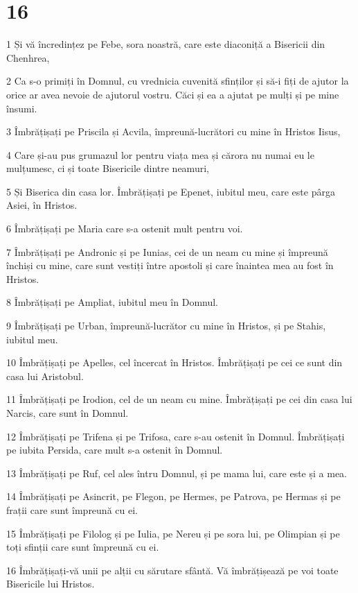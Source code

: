 \chapter{16}

\par 1 Și vă încredințez pe Febe, sora noastră, care este diaconiță a Bisericii din Chenhrea,
\par 2 Ca s-o primiți în Domnul, cu vrednicia cuvenită sfinților și să-i fiți de ajutor la orice ar avea nevoie de ajutorul vostru. Căci și ea a ajutat pe mulți și pe mine însumi.
\par 3 Îmbrățișați pe Priscila și Acvila, împreună-lucrători cu mine în Hristos Iisus,
\par 4 Care și-au pus grumazul lor pentru viața mea și cărora nu numai eu le mulțumesc, ci și toate Bisericile dintre neamuri,
\par 5 Și Biserica din casa lor. Îmbrățișați pe Epenet, iubitul meu, care este pârga Asiei, în Hristos.
\par 6 Îmbrățișați pe Maria care s-a ostenit mult pentru voi.
\par 7 Îmbrățișați pe Andronic și pe Iunias, cei de un neam cu mine și împreună închiși cu mine, care sunt vestiți între apostoli și care înaintea mea au fost în Hristos.
\par 8 Îmbrățișați pe Ampliat, iubitul meu în Domnul.
\par 9 Îmbrățișați pe Urban, împreună-lucrător cu mine în Hristos, și pe Stahis, iubitul meu.
\par 10 Îmbrățișați pe Apelles, cel încercat în Hristos. Îmbrățișați pe cei ce sunt din casa lui Aristobul.
\par 11 Îmbrățișați pe Irodion, cel de un neam cu mine. Îmbrățișați pe cei din casa lui Narcis, care sunt în Domnul.
\par 12 Îmbrățișați pe Trifena și pe Trifosa, care s-au ostenit în Domnul. Îmbrățișați pe iubita Persida, care mult s-a ostenit în Domnul.
\par 13 Îmbrățișați pe Ruf, cel ales întru Domnul, și pe mama lui, care este și a mea.
\par 14 Îmbrățișați pe Asincrit, pe Flegon, pe Hermes, pe Patrova, pe Hermas și pe frații care sunt împreună cu ei.
\par 15 Îmbrățișați pe Filolog și pe Iulia, pe Nereu și pe sora lui, pe Olimpian și pe toți sfinții care sunt împreună cu ei.
\par 16 Îmbrățișați-vă unii pe alții cu sărutare sfântă. Vă îmbrățișează pe voi toate Bisericile lui Hristos.
